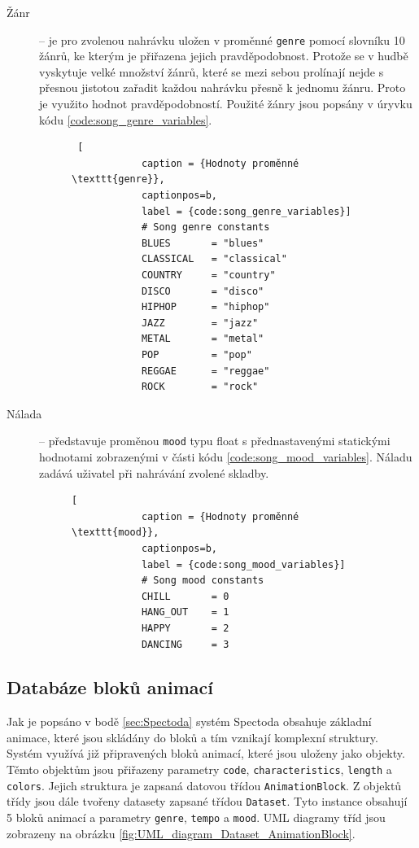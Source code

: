 \begin{description}
    \item[Žánr] -- je pro zvolenou nahrávku uložen v proměnné \texttt{genre} pomocí slovníku 10 žánrů, ke kterým je přiřazena jejich pravděpodobnost. Protože se v hudbě vyskytuje velké množství žánrů, které se mezi sebou prolínají nejde s přesnou jistotou zařadit každou nahrávku přesně k jednomu žánru. Proto je využito hodnot pravděpodobností. Použité žánry jsou popsány v úryvku kódu \ref{code:song_genre_variables}.
    \begin{figure}[H]
        \begin{lstlisting} [
            caption = {Hodnoty proměnné \texttt{genre}},
            captionpos=b,
            label = {code:song_genre_variables}]
            # Song genre constants
            BLUES       = "blues"
            CLASSICAL   = "classical"
            COUNTRY     = "country"
            DISCO       = "disco"
            HIPHOP      = "hiphop"
            JAZZ        = "jazz"
            METAL       = "metal"
            POP         = "pop"
            REGGAE      = "reggae"
            ROCK        = "rock"
        \end{lstlisting}
    \end{figure}

    \item[Nálada] -- představuje proměnou \texttt{mood} typu float s přednastavenými statickými hodnotami zobrazenými v části kódu \ref{code:song_mood_variables}. Náladu zadává uživatel při nahrávání zvolené skladby.  
    \begin{figure}[H]        
        \begin{lstlisting}[
            caption = {Hodnoty proměnné \texttt{mood}},
            captionpos=b,
            label = {code:song_mood_variables}]
            # Song mood constants
            CHILL       = 0
            HANG_OUT    = 1
            HAPPY       = 2
            DANCING     = 3
        \end{lstlisting}
    \end{figure}
    
\end{description}

\subsection{Databáze bloků animací} \label{sec:Database_structure}
Jak je popsáno v bodě \ref{sec:Spectoda} systém Spectoda obsahuje základní animace, které jsou skládány do bloků a tím vznikají komplexní struktury. Systém využívá již připravených bloků animací, které jsou uloženy jako objekty. Těmto objektům jsou přiřazeny parametry \texttt{code}, \texttt{characteristics}, \texttt{length} a \texttt{colors}. Jejich struktura je zapsaná datovou třídou \texttt{AnimationBlock}. Z objektů třídy jsou dále tvořeny datasety zapsané třídou \texttt{Dataset}. Tyto instance obsahují 5 bloků animací a parametry \texttt{genre}, \texttt{tempo} a \texttt{mood}. UML diagramy tříd jsou zobrazeny na obrázku \ref{fig:UML_diagram_Dataset_AnimationBlock}.

